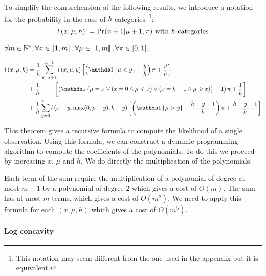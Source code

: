 \begin{definition}
    To simplify the comprehension of the following results, we introduce a notation for the probability in the case of $h$ categories~\footnote{This notation may seem different from the one used in the appendix but it is equivalent.}:
    \[ \mathnormal{l}\left(x, \mu, h\right) := \Pr(x + 1 | \mu + 1, \pi) \text{ with }h\text{ categories}\]
\end{definition}

\begin{thm}
    \label{thm:computing_likelihood_bos}
    $\forall m \in \mathbb{N}^*, \forall x \in \left\llbracket1, m\right\rrbracket, \forall \mu \in \left\llbracket1, m\right\rrbracket, \forall \pi \in [0, 1]$:

\begin{equation}
    \begin{aligned}
        \bosl{x}{\mu}{h}
        &=\frac{1}{h} \sum_{y = x + 1}^{h - 1} \bosl{x}{\mu}{y} \left[ \left( \indickronecker{\mu < y} - \frac{y}{h} \right) \pi + \frac{y}{h} \right] \\
            &+\frac{1}{h} \ \qquad \left[ \left( \indickronecker{\mu = x \lor (x = 0 \land \mu \leq x) \lor (x = h - 1 \land \mu \geq x)} - 1 \right) \pi +  \frac{1}{h} \right] \\
            &+\frac{1}{h} \sum_{y = 0}^{x - 1}\bosl{x - y}{\max(0, \mu - y)}{h - y}    \left[ \left( \indickronecker{\mu > y} - \frac{h - y - 1}{h} \right) \pi + \frac{h - y - 1}{h} \right]
    \end{aligned} \\
\end{equation}
\end{thm}

This theorem gives a recursive formula to compute the likelihood of a single observation. Using this formula, we can construct a dynamic programming algorithm to compute the coefficients of the polynomials. To do this we proceed by increasing $x$, $\mu$ and $h$. We do directly the multiplication of the polynomials.

Each term of the sum require the multiplication of a polynomial of degree at most $m - 1$ by a polynomial of degree $2$ which gives a cost of $O(m)$. The sum has at most $m$ terms, which gives a cost of $O(m^2)$. We need to apply this formula for each $(x, \mu, h)$ which gives a cost of $O(m^5)$.

\paragraph{Log concavity}

